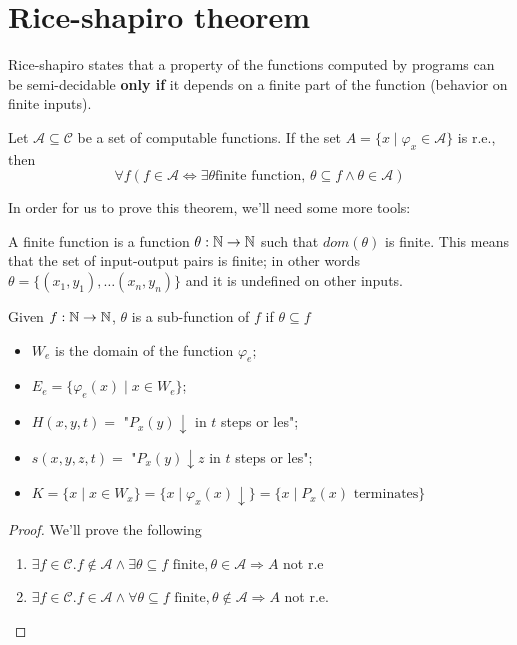 \chapter {Rice-shapiro theorem}
Rice-shapiro states that a property of the functions computed by
programs can be semi-decidable \textbf{only if} it depends on a finite
part of the function (behavior on finite inputs). 
\begin{theorem}
  Let $\mathcal{A} \subseteq \mathcal{C}$ be a set of computable
  functions. If the set $A = \{x \mid \varphi_x \in \mathcal{A}\}$ is
  r.e., then
  \[
    \forall f (f \in \mathcal{A} \Leftrightarrow \exists \theta \mbox{
      finite function, } \theta \subseteq f \land \theta \in
    \mathcal{A})
  \]

In order for us to prove this theorem, we'll need some more tools:
\begin{definition}
  A finite function is a function $ \theta: \mathbb{N}\rightarrow\mathbb{N} $
  such that $ dom(\theta) $ is finite.  This means that the set of
  input-output pairs is finite; in other words
  $ \theta = \{(x_1,y_1),\dots(x_n,y_n) \} $ and it is undefined on other inputs.
\end{definition}

\begin{definition}
  Given $ f:\mathbb{N}\rightarrow\mathbb{N} $, $ \theta $ is a sub-function of
$f$ if $ \theta \subseteq f $
\end{definition}


\begin{notation}
  \begin{itemize}
  \item $ W_e $ is the domain of the function $ \varphi_e $;
  \item $ E_e = \{\varphi_e(x) \mid x\in W_e \}$;
  \item $ H(x,y,t) = $ "$ P_x(y)\downarrow $ in $t$ steps or les";
  \item $ s(x,y,z,t) =$ "$ P_x(y)\downarrow z$ in $t$ steps or les";
  \item $ K = \{x \mid x\in W_x \} = \{x\mid \varphi_x(x)\downarrow \} =
    \{x\mid P_x(x) \mbox{ terminates} \}$
  \end{itemize}
\end{notation}

\begin{proof}
  We'll prove the following
  \begin{enumerate}
    \item $ \exists f \in \mathcal{C} . f \not\in \mathcal{A} \land
    \exists\theta\subseteq f \mbox{ finite}, \theta\in\mathcal{A} \Rightarrow
    A$ not r.e
    \item $ \exists f \in \mathcal{C}. f\in\mathcal{A} \land
    \forall\theta\subseteq f \mbox{ finite}, \theta\not\in\mathcal{A}\Rightarrow
    A$ not r.e.
  \end{enumerate}


\end{proof}
\end{theorem}
